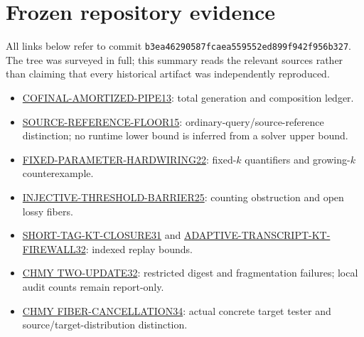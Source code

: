 \documentclass[11pt]{article}
\begin{document}
\section{Frozen repository evidence}

All links below refer to commit
\texttt{b3ea46290587fcaea559552ed899f942f956b327}. The tree was surveyed in
full; this summary reads the relevant sources rather than claiming that
every historical artifact was independently reproduced.
\begin{itemize}
\item \href{https://github.com/j15marti/pnp/blob/b3ea46290587fcaea559552ed899f942f956b327/research/main/2026-10-20_1048_MAIN_COFINAL_AMORTIZED_PIPE13.md}{COFINAL-AMORTIZED-PIPE13}: total generation and composition ledger.
\item \href{https://github.com/j15marti/pnp/blob/b3ea46290587fcaea559552ed899f942f956b327/research/main/2026-10-20_1248_MAIN_SOURCE_REFERENCE_FLOOR15.md}{SOURCE-REFERENCE-FLOOR15}: ordinary-query/source-reference distinction; no runtime lower bound is inferred from a solver upper bound.
\item \href{https://github.com/j15marti/pnp/blob/b3ea46290587fcaea559552ed899f942f956b327/research/main/2026-10-20_1948_MAIN_FIXED_PARAMETER_HARDWIRING22.md}{FIXED-PARAMETER-HARDWIRING22}: fixed-$k$ quantifiers and growing-$k$ counterexample.
\item \href{https://github.com/j15marti/pnp/blob/b3ea46290587fcaea559552ed899f942f956b327/research/main/2026-10-20_2253_MAIN_INJECTIVE_THRESHOLD_BARRIER25.tex}{INJECTIVE-THRESHOLD-BARRIER25}: counting obstruction and open lossy fibers.
\item \href{https://github.com/j15marti/pnp/blob/b3ea46290587fcaea559552ed899f942f956b327/research/main/2026-10-21_0348_MAIN_SHORT_TAG_KT_CLOSURE31.md}{SHORT-TAG-KT-CLOSURE31} and
\href{https://github.com/j15marti/pnp/blob/b3ea46290587fcaea559552ed899f942f956b327/research/main/2026-10-21_0448_MAIN_ADAPTIVE_TRANSCRIPT_KT_FIREWALL32.md}{ADAPTIVE-TRANSCRIPT-KT-FIREWALL32}: indexed replay bounds.
\item \href{https://github.com/j15marti/pnp/blob/b3ea46290587fcaea559552ed899f942f956b327/research/agents/chmy-threshold/2026-10-21_0512_CHMY_TWO_UPDATE32.md}{CHMY TWO-UPDATE32}: restricted digest and fragmentation failures; local audit counts remain report-only.
\item \href{https://github.com/j15marti/pnp/blob/b3ea46290587fcaea559552ed899f942f956b327/research/agents/chmy-threshold/2026-10-21_0712_CHMY_FIBER_CANCELLATION34.md}{CHMY FIBER-CANCELLATION34}: actual concrete target tester and source/target-distribution distinction.

\end{itemize}
\end{document}
